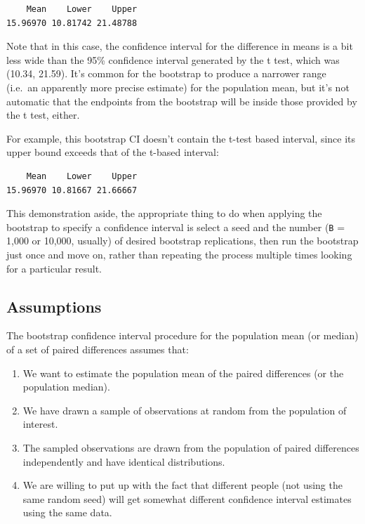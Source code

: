 \documentclass[
]{book}
\newenvironment{Shaded}{\begin{snugshade}}{\end{snugshade}}
\newcommand{\DataTypeTok}[1]{\textcolor[rgb]{0.13,0.29,0.53}{#1}}
\newcommand{\DecValTok}[1]{\textcolor[rgb]{0.00,0.00,0.81}{#1}}
\newcommand{\FloatTok}[1]{\textcolor[rgb]{0.00,0.00,0.81}{#1}}
\newcommand{\KeywordTok}[1]{\textcolor[rgb]{0.13,0.29,0.53}{\textbf{#1}}}
\newcommand{\NormalTok}[1]{#1}
\newcommand{\OperatorTok}[1]{\textcolor[rgb]{0.81,0.36,0.00}{\textbf{#1}}}
\newcommand{\StringTok}[1]{\textcolor[rgb]{0.31,0.60,0.02}{#1}}
\providecommand{\tightlist}{%
  \setlength{\itemsep}{0pt}\setlength{\parskip}{0pt}}
\begin{document}
\begin{verbatim}
    Mean    Lower    Upper 
15.96970 10.81742 21.48788 
\end{verbatim}

Note that in this case, the confidence interval for the difference in means is a bit less wide than the 95\% confidence interval generated by the t test, which was (10.34, 21.59). It's common for the bootstrap to produce a narrower range (i.e.~an apparently more precise estimate) for the population mean, but it's not automatic that the endpoints from the bootstrap will be inside those provided by the t test, either.

For example, this bootstrap CI doesn't contain the t-test based interval, since its upper bound exceeds that of the t-based interval:

\begin{Shaded}
\end{Shaded}

\begin{verbatim}
    Mean    Lower    Upper 
15.96970 10.81667 21.66667 
\end{verbatim}

This demonstration aside, the appropriate thing to do when applying the bootstrap to specify a confidence interval is select a seed and the number (\texttt{B} = 1,000 or 10,000, usually) of desired bootstrap replications, then run the bootstrap just once and move on, rather than repeating the process multiple times looking for a particular result.

\hypertarget{assumptions-1}{%
\subsection{Assumptions}\label{assumptions-1}}

The bootstrap confidence interval procedure for the population mean (or median) of a set of paired differences assumes that:

\begin{enumerate}
\def\labelenumi{\arabic{enumi}.}
\tightlist
\item
  We want to estimate the population mean of the paired differences (or the population median).
\item
  We have drawn a sample of observations at random from the population of interest.
\item
  The sampled observations are drawn from the population of paired differences independently and have identical distributions.
\item
  We are willing to put up with the fact that different people (not using the same random seed) will get somewhat different confidence interval estimates using the same data.
\end{enumerate}
\end{document}
